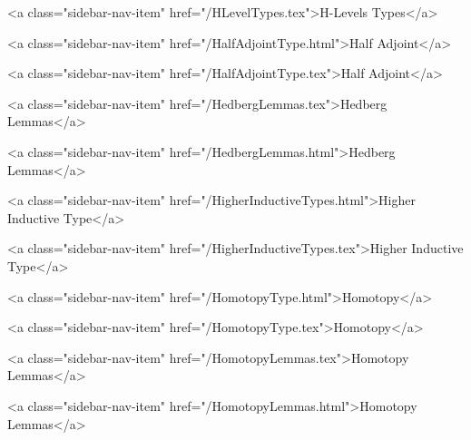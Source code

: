       
        
          <a class="sidebar-nav-item" href="/HLevelTypes.tex">H-Levels Types</a>
        
      
    
      
        
          <a class="sidebar-nav-item" href="/HalfAdjointType.html">Half Adjoint</a>
        
      
    
      
        
          <a class="sidebar-nav-item" href="/HalfAdjointType.tex">Half Adjoint</a>
        
      
    
      
        
          <a class="sidebar-nav-item" href="/HedbergLemmas.tex">Hedberg Lemmas</a>
        
      
    
      
        
          <a class="sidebar-nav-item" href="/HedbergLemmas.html">Hedberg Lemmas</a>
        
      
    
      
        
          <a class="sidebar-nav-item" href="/HigherInductiveTypes.html">Higher Inductive Type</a>
        
      
    
      
        
          <a class="sidebar-nav-item" href="/HigherInductiveTypes.tex">Higher Inductive Type</a>
        
      
    
      
        
          <a class="sidebar-nav-item" href="/HomotopyType.html">Homotopy</a>
        
      
    
      
        
          <a class="sidebar-nav-item" href="/HomotopyType.tex">Homotopy</a>
        
      
    
      
        
          <a class="sidebar-nav-item" href="/HomotopyLemmas.tex">Homotopy Lemmas</a>
        
      
    
      
        
          <a class="sidebar-nav-item" href="/HomotopyLemmas.html">Homotopy Lemmas</a>
        
